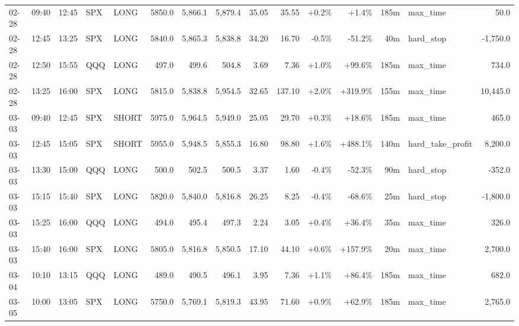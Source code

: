 \documentclass[11pt,a4paper,twoside]{article}
\begin{document}
\begin{landscape}
\begin{center}
\begin{longtable}{>{\color{txtmain}}l l l l l r r r r r r r r >{\color{txtmain}}l r}
02-28 & 09:40 & 12:45 & SPX & LONG & 5850.0 & 5,866.1 & 5,879.4 & 35.05 & 35.55 & \textcolor{wingreen}{+0.2\%} & \textcolor{wingreen}{+1.4\%} & 185m & max\_time & \textcolor{wingreen}{50.0} \\
02-28 & 12:45 & 13:25 & SPX & LONG & 5840.0 & 5,865.3 & 5,838.8 & 34.20 & 16.70 & \textcolor{lossred}{-0.5\%} & \textcolor{lossred}{-51.2\%} & 40m & hard\_stop & \textcolor{lossred}{-1,750.0} \\
02-28 & 12:50 & 15:55 & QQQ & LONG & 497.0 & 499.6 & 504.8 & 3.69 & 7.36 & \textcolor{wingreen}{+1.0\%} & \textcolor{wingreen}{+99.6\%} & 185m & max\_time & \textcolor{wingreen}{734.0} \\
02-28 & 13:25 & 16:00 & SPX & LONG & 5815.0 & 5,838.8 & 5,954.5 & 32.65 & 137.10 & \textcolor{wingreen}{+2.0\%} & \textcolor{wingreen}{+319.9\%} & 155m & max\_time & \textcolor{wingreen}{10,445.0} \\
03-03 & 09:40 & 12:45 & SPX & SHORT & 5975.0 & 5,964.5 & 5,949.0 & 25.05 & 29.70 & \textcolor{wingreen}{+0.3\%} & \textcolor{wingreen}{+18.6\%} & 185m & max\_time & \textcolor{wingreen}{465.0} \\
03-03 & 12:45 & 15:05 & SPX & SHORT & 5955.0 & 5,948.5 & 5,855.3 & 16.80 & 98.80 & \textcolor{wingreen}{+1.6\%} & \textcolor{wingreen}{+488.1\%} & 140m & hard\_take\_profit & \textcolor{wingreen}{8,200.0} \\
03-03 & 13:30 & 15:00 & QQQ & LONG & 500.0 & 502.5 & 500.5 & 3.37 & 1.60 & \textcolor{lossred}{-0.4\%} & \textcolor{lossred}{-52.3\%} & 90m & hard\_stop & \textcolor{lossred}{-352.0} \\
03-03 & 15:15 & 15:40 & SPX & LONG & 5820.0 & 5,840.0 & 5,816.8 & 26.25 & 8.25 & \textcolor{lossred}{-0.4\%} & \textcolor{lossred}{-68.6\%} & 25m & hard\_stop & \textcolor{lossred}{-1,800.0} \\
03-03 & 15:25 & 16:00 & QQQ & LONG & 494.0 & 495.4 & 497.3 & 2.24 & 3.05 & \textcolor{wingreen}{+0.4\%} & \textcolor{wingreen}{+36.4\%} & 35m & max\_time & \textcolor{wingreen}{326.0} \\
03-03 & 15:40 & 16:00 & SPX & LONG & 5805.0 & 5,816.8 & 5,850.5 & 17.10 & 44.10 & \textcolor{wingreen}{+0.6\%} & \textcolor{wingreen}{+157.9\%} & 20m & max\_time & \textcolor{wingreen}{2,700.0} \\
03-04 & 10:10 & 13:15 & QQQ & LONG & 489.0 & 490.5 & 496.1 & 3.95 & 7.36 & \textcolor{wingreen}{+1.1\%} & \textcolor{wingreen}{+86.4\%} & 185m & max\_time & \textcolor{wingreen}{682.0} \\
03-05 & 10:00 & 13:05 & SPX & LONG & 5750.0 & 5,769.1 & 5,819.3 & 43.95 & 71.60 & \textcolor{wingreen}{+0.9\%} & \textcolor{wingreen}{+62.9\%} & 185m & max\_time & \textcolor{wingreen}{2,765.0} \\

\end{longtable}
\end{center}
\end{landscape}
\end{document}
